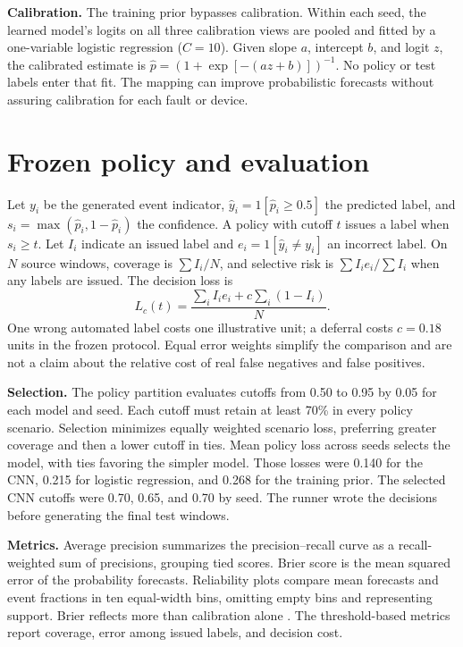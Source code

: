 \documentclass[11pt,letterpaper]{article}
\begin{document}
\textbf{Calibration.} The training prior bypasses calibration. Within each seed, the learned model's logits on all three calibration views are pooled and fitted by a one-variable logistic regression (\(C=10\)). Given slope \(a\), intercept \(b\), and logit \(z\), the calibrated estimate is \(\hat p=(1+\exp[-(az+b)])^{-1}\). No policy or test labels enter that fit. The mapping can improve probabilistic forecasts without assuring calibration for each fault or device.

\clearpage
\section{Frozen policy and evaluation}\label{sec:policy}

Let \(y_i\) be the generated event indicator, \(\hat y_i=1[\hat p_i\geq0.5]\) the predicted label, and \(s_i=\max(\hat p_i,1-\hat p_i)\) the confidence. A policy with cutoff \(t\) issues a label when \(s_i\geq t\). Let \(I_i\) indicate an issued label and \(e_i=1[\hat y_i\ne y_i]\) an incorrect label. On \(N\) source windows, coverage is \(\sum I_i/N\), and selective risk is \(\sum I_i e_i/\sum I_i\) when any labels are issued. The decision loss is
\[
L_c(t)=\frac{\sum_i I_i e_i+c\sum_i(1-I_i)}{N}.
\]
One wrong automated label costs one illustrative unit; a deferral costs \(c=0.18\) units in the frozen protocol. Equal error weights simplify the comparison and are not a claim about the relative cost of real false negatives and false positives.

\textbf{Selection.} The policy partition evaluates cutoffs from 0.50 to 0.95 by 0.05 for each model and seed. Each cutoff must retain at least 70\% in every policy scenario. Selection minimizes equally weighted scenario loss, preferring greater coverage and then a lower cutoff in ties. Mean policy loss across seeds selects the model, with ties favoring the simpler model. Those losses were 0.140 for the CNN, 0.215 for logistic regression, and 0.268 for the training prior. The selected CNN cutoffs were 0.70, 0.65, and 0.70 by seed. The runner wrote the decisions before generating the final test windows.

\textbf{Metrics.} Average precision summarizes the precision--recall curve as a recall-weighted sum of precisions, grouping tied scores. Brier score is the mean squared error of the probability forecasts. Reliability plots compare mean forecasts and event fractions in ten equal-width bins, omitting empty bins and representing support. Brier reflects more than calibration alone \cite{sklearn}. The threshold-based metrics report coverage, error among issued labels, and decision cost.
\end{document}
